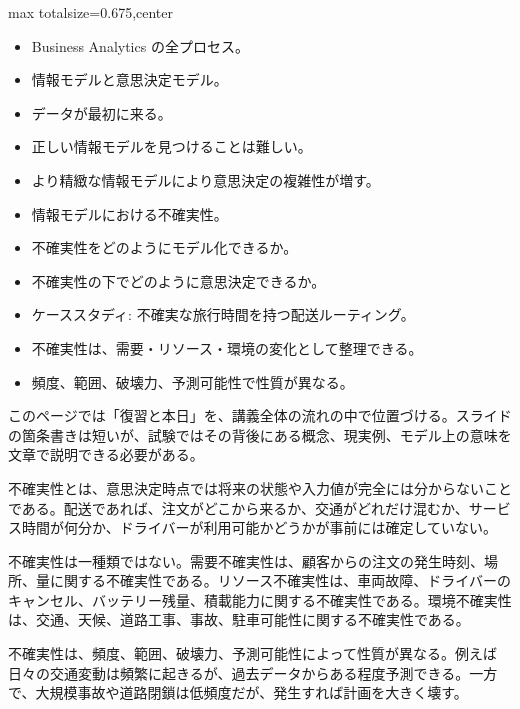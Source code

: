 \clearpage
{}
\begin{adjustbox}{max totalsize={\textwidth}{0.675\textheight},center}
\begin{minipage}{\textwidth}\scriptsize
\begin{minipage}[t]{0.485\textwidth}
\begin{itemize}
\item Business Analytics の全プロセス。
\item 情報モデルと意思決定モデル。
\item データが最初に来る。
\item 正しい情報モデルを見つけることは難しい。
\item より精緻な情報モデルにより意思決定の複雑性が増す。
\item 情報モデルにおける不確実性。
\item 不確実性をどのようにモデル化できるか。
\item 不確実性の下でどのように意思決定できるか。
\item ケーススタディ: 不確実な旅行時間を持つ配送ルーティング。
\end{itemize}
\begin{itemize}
\item 不確実性は、需要・リソース・環境の変化として整理できる。
\item 頻度、範囲、破壊力、予測可能性で性質が異なる。
\end{itemize}
\end{minipage}\hfill
\begin{minipage}[t]{0.485\textwidth}
このページでは「復習と本日」を、講義全体の流れの中で位置づける。スライドの箇条書きは短いが、試験ではその背後にある概念、現実例、モデル上の意味を文章で説明できる必要がある。\par
不確実性とは、意思決定時点では将来の状態や入力値が完全には分からないことである。配送であれば、注文がどこから来るか、交通がどれだけ混むか、サービス時間が何分か、ドライバーが利用可能かどうかが事前には確定していない。\par
不確実性は一種類ではない。需要不確実性は、顧客からの注文の発生時刻、場所、量に関する不確実性である。リソース不確実性は、車両故障、ドライバーのキャンセル、バッテリー残量、積載能力に関する不確実性である。環境不確実性は、交通、天候、道路工事、事故、駐車可能性に関する不確実性である。\par
不確実性は、頻度、範囲、破壊力、予測可能性によって性質が異なる。例えば日々の交通変動は頻繁に起きるが、過去データからある程度予測できる。一方で、大規模事故や道路閉鎖は低頻度だが、発生すれば計画を大きく壊す。\par

\end{minipage}
\end{minipage}
\end{adjustbox}
